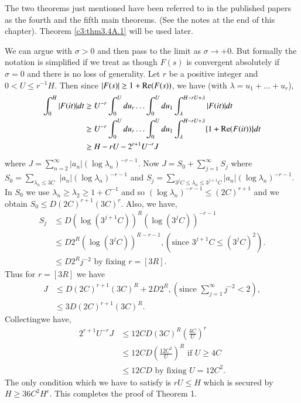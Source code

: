 \begin{remarks*}
The two theorems just mentioned have been referred to in the published papers as the fourth and the fifth main theorems. (See the notes at the end of this chapter). Theorem \ref{c3:thm3.4A.1} will be used later.
\end{remarks*}

\medskip
{} 
We can  argue with $\sigma  >0$ and then pass to the limit as $\sigma \to + 0$. But formally the notation is simplified if we treat as though $F(s)$ is convergent absolutely if $\sigma =0$ and there is no loss of generality. Let $r$ be a positive integer and $0< U \leq r^{-1} H$. Then since $|F(s)| \geq 1 + \operatorname{Re} (F(s))$, we have (with $\lambda = u_1 + \ldots + u_r$),
\begin{align*}
\int^H_0 |F(it)| dt & \geq  U^{-r} \int^U_0 du_r \ldots \int^U_0 du_1 \int^{H-rU+\lambda}_\lambda |F(it)| dt \\
& \geq U^{-r} \int^U_0 du_r \ldots \int^U_0 du_1 \int^{H-r U+\lambda}_\lambda \{1+ \operatorname{Re} (F(it)) \} dt \\
& \geq H - rU - 2^{r+1} U^{-r} J
\end{align*}
where $J = \sum\limits^\infty_{n=2} |a_n| (\log \lambda_n)^{-r-1}$. Now $J = S_0 + \sum\limits^\infty_{j=1} S_j$ where $S_0 = \sum\limits_{\lambda_n \leq 3C}$ $|a_n| (\log \lambda_n)^{-r-1}$ and $S_j = \sum\limits_{3^j C \leq \lambda_n \leq 3^{j+1} C} |a_n| (\log \lambda_n)^{-r-1}$. In $S_0$ we use $\lambda_n \geq \lambda_2 \geq 1 + C^{-1}$ and so $(\log \lambda_n)^{-r-1} \leq (2C)^{r+1}$ and we obtain $S_0 \leq D (2C)^{r+1} (3C)^{r}$. Also, we have,
\begin{align*}
S_j & \leq D (\log (3^{j+1} C))^R (\log (3^j C))^{-r-1}\\
& \leq D 2^R (\log (3^j C))^{R-r-1}, (\text{since } 3^{j+1} C \leq (3^j C)^2). \\
& \leq D 2^{R} j^{-2} \text{ by fixing  } r = [3R].
\end{align*}
Thus for $r = [3R]$ we have
\begin{align*}
J & \leq D (2C)^{r+1} (3C)^{R} + 2D2^R, (\text{since } \sum\limits^\infty_{j=1} j^{-2} < 2),\\
& \leq 3 D(2C)^{r+1} (3C)^{R}.
\end{align*}
Collecting\pageoriginale we have,
\begin{align*}
2^{r+1} U^{-r} J & \leq 12 C D (3C)^R \left(\frac{4C}{U} \right)^r\\
& \leq 12 C D \left(\frac{12C^2}{U} \right)^R \text{ if } U \geq 4C\\
& \leq 12 C D \text{ by fixing } U = 12 C^2.
\end{align*}
The only condition which we have to satisfy is $r U \leq H$ which is secured by $H \geq 36 C^2 H^\epsilon$. This completes the proof of Theorem 1.

